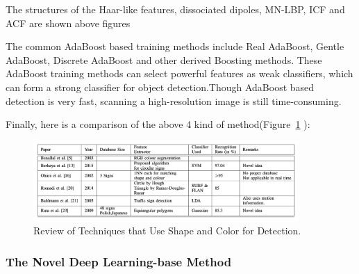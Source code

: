 \documentclass[letterpaper, 10 pt, conference]{ieeeconf}
\begin{document}
The structures of the Haar-like features, dissociated dipoles, MN-LBP, ICF and ACF are shown above figures

The common AdaBoost based training methods include Real AdaBoost, Gentle AdaBoost, Discrete AdaBoost and other derived Boosting methods. These AdaBoost training methods can select powerful features as weak classifiers, which can form a strong classifier for object detection.Though AdaBoost based detection is very fast, scanning a high-resolution image is still time-consuming.

Finally, here is a comparison of the above 4 kind of method(Figure~\ref{fig:review} \cite{Liu2019}):

\begin{figure}[!t]
    \centering
    \includegraphics[width=0.9\textwidth]{figures/review.jpg} 
    \caption{Review of Techniques that Use Shape and Color for Detection.}
    \label{fig:review}
\end{figure}

\subsubsection{The Novel Deep Learning-base Method}\
\end{document}

